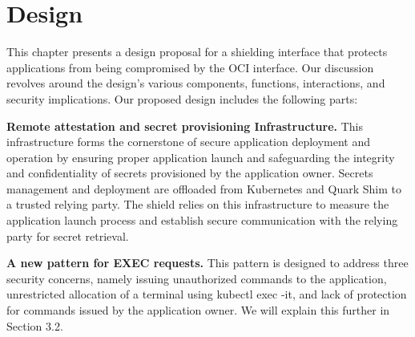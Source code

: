 \chapter{Design}
\label{sec:design}




This chapter presents a design proposal for a shielding interface that protects applications from being compromised by the OCI interface. Our discussion revolves around the design's various components, functions, interactions, and security 
implications. Our proposed design includes the following parts:

\textbf{Remote attestation and secret provisioning Infrastructure.} This infrastructure forms the cornerstone of secure application deployment and operation by ensuring proper application launch and safeguarding the integrity and confidentiality of 
secrets provisioned by the application owner. Secrets management and deployment are offloaded from Kubernetes and Quark Shim to a trusted relying party. The shield relies on this infrastructure to measure the application launch process and 
establish secure communication with the relying party for secret retrieval.

\textbf{A new pattern for EXEC requests.} This pattern is designed to address three security concerns, namely issuing unauthorized commands to the application, unrestricted allocation of a terminal using kubectl exec -it, and lack of protection for 
commands issued by the application owner. We will explain this further in Section 3.2.
 

